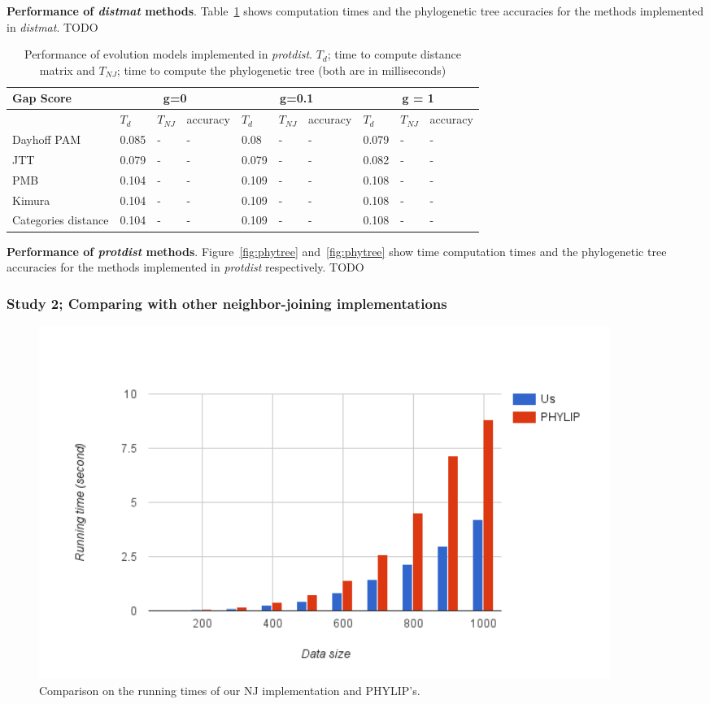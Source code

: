 \documentclass[11pt,letterpaper]{article}
\theoremstyle{definition}
\begin{document}
\textbf{Performance of \textit{distmat} methods}. Table~\ref{tab:dist1}  shows computation times and the phylogenetic tree accuracies for the methods implemented in \textit{distmat}. TODO

\begin{table}[!h]
\centering
	\begin{tabular}{l|lll|lll|lll}

Gap Score	& \multicolumn{3}{c}{g=0} & \multicolumn{3}{c}{g=0.1} &  \multicolumn{3}{c}{g = 1} \\
\hline
&	$T_d$	& $T_{NJ}$	& accuracy &	$T_d$	& $T_{NJ}$	& accuracy &	$T_d$	& $T_{NJ}$	& accuracy \\
\hline
Dayhoff PAM		&	0.085	&	-	&	-	&	0.08	&	-	&	-	&	0.079	&	-	&	-	\\
JTT	&	0.079	&	-	&	-	&	0.079	&	-	&	-	&	0.082	&	-	&	-	\\
PMB	&	0.104	&	-	&	-	&	0.109	&	-	&	-	&	0.108	&	-	&	-	\\
Kimura	&	0.104	&	-	&	-	&	0.109	&	-	&	-	&	0.108	&	-	&	-	\\
Categories distance	&	0.104	&	-	&	-	&	0.109	&	-	&	-	&	0.108	&	-	&	-	\\
\hline
\end{tabular}
\caption{Performance of evolution models implemented in \textit{protdist}. 
$T_d$; time to compute distance matrix and $T_{NJ}$; time to compute the phylogenetic tree (both are in milliseconds)}\label{tab:dist1}
\end{table}

\textbf{Performance of \textit{protdist} methods}. Figure~\ref{fig:phytree} and~\ref{fig:phytree} show time computation times and the phylogenetic tree accuracies for the methods implemented in \textit{protdist} respectively. TODO 

\subsubsection{Study 2; Comparing with other neighbor-joining implementations}

\begin{figure}[t]
  \centering
  \includegraphics[width=0.9\textwidth]{runningtime.png}
  \caption{Comparison on the running times of our NJ implementation and PHYLIP's.}
  \label{fig:runningtime}
\end{figure}
\end{document}
